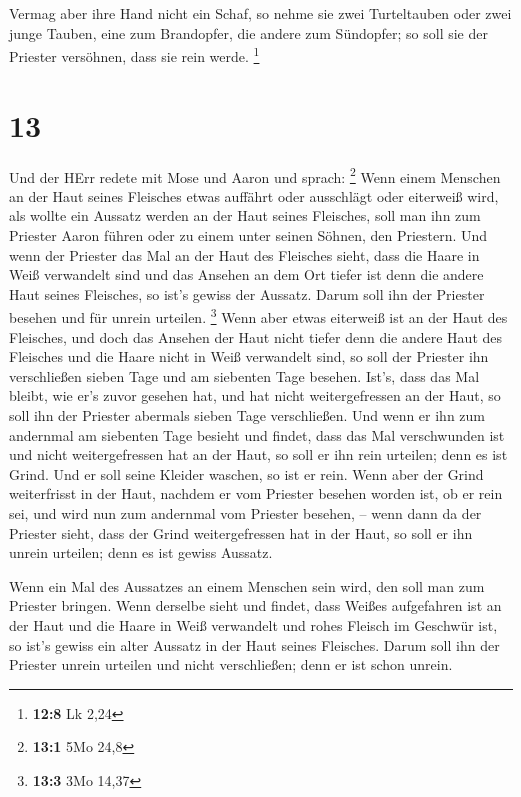 Vermag aber ihre Hand nicht ein Schaf, so nehme sie zwei
Turteltauben oder zwei junge Tauben, eine zum Brandopfer, die andere zum
Sündopfer; so soll sie der Priester versöhnen, dass sie rein werde.
\footnote{\textbf{12:8} Lk 2,24}

\hypertarget{section-3}{%
\section{13}\label{section-3}}

 Und der HErr redete mit Mose und Aaron und sprach:
\footnote{\textbf{13:1} 5Mo 24,8}  Wenn einem Menschen an
der Haut seines Fleisches etwas auffährt oder ausschlägt oder eiterweiß
wird, als wollte ein Aussatz werden an der Haut seines Fleisches, soll
man ihn zum Priester Aaron führen oder zu einem unter seinen Söhnen, den
Priestern.  Und wenn der Priester das Mal an der Haut des
Fleisches sieht, dass die Haare in Weiß verwandelt sind und das Ansehen
an dem Ort tiefer ist denn die andere Haut seines Fleisches, so ist's
gewiss der Aussatz. Darum soll ihn der Priester besehen und für unrein
urteilen. \footnote{\textbf{13:3} 3Mo 14,37}  Wenn aber
etwas eiterweiß ist an der Haut des Fleisches, und doch das Ansehen der
Haut nicht tiefer denn die andere Haut des Fleisches und die Haare nicht
in Weiß verwandelt sind, so soll der Priester ihn verschließen sieben
Tage  und am siebenten Tage besehen. Ist's, dass das Mal
bleibt, wie er's zuvor gesehen hat, und hat nicht weitergefressen an der
Haut,  so soll ihn der Priester abermals sieben Tage
verschließen. Und wenn er ihn zum andernmal am siebenten Tage besieht
und findet, dass das Mal verschwunden ist und nicht weitergefressen hat
an der Haut, so soll er ihn rein urteilen; denn es ist Grind. Und er
soll seine Kleider waschen, so ist er rein.  Wenn aber der
Grind weiterfrisst in der Haut, nachdem er vom Priester besehen worden
ist, ob er rein sei, und wird nun zum andernmal vom Priester besehen, --
 wenn dann da der Priester sieht, dass der Grind
weitergefressen hat in der Haut, so soll er ihn unrein urteilen; denn es
ist gewiss Aussatz.

 Wenn ein Mal des Aussatzes an einem Menschen sein wird, den
soll man zum Priester bringen.  Wenn derselbe sieht und
findet, dass Weißes aufgefahren ist an der Haut und die Haare in Weiß
verwandelt und rohes Fleisch im Geschwür ist,  so ist's
gewiss ein alter Aussatz in der Haut seines Fleisches. Darum soll ihn
der Priester unrein urteilen und nicht verschließen; denn er ist schon
unrein.

